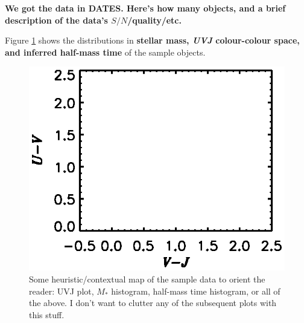 \documentclass[a4paper,fleqn,usenatbib]{mnras}
\newcommand{\Mstel}{M_\ast}
\newcommand{\bfr}{\bf\color{red}}
\newcommand{\bfb}{\color{myblue}}
\begin{document}
{\bfr We got the data in DATES. Here's how many objects, and a brief description of the data's
$S/N$/quality/etc.}

Figure \ref{fig:sample} shows the distributions in {\bfr stellar mass, {\it UVJ} colour-colour space, 
and inferred half-mass time} of the sample objects.

\begin{figure}
	\centering
	\includegraphics[width = \columnwidth, trim=1cm 0.7cm 0cm 3cm]{context}
	\caption{\bfb Some heuristic/contextual map of the sample data to orient the reader: UVJ plot, 
			$\Mstel$ histogram, half-mass time histogram, or all of the above. I don't want to 
			clutter any of the subsequent plots with this stuff.}
	\label{fig:sample}
\end{figure}

\end{document}
